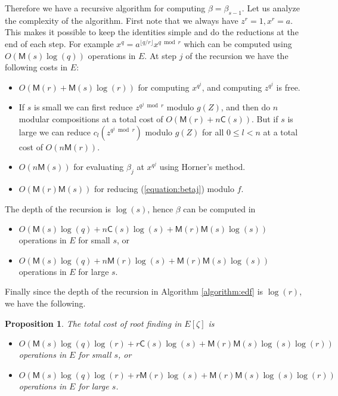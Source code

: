 \documentclass[12pt]{article}
\theoremstyle{plain}
\newtheorem{proposition}[theorem]{Proposition}
\theoremstyle{definition}
\def\MM{\ensuremath{\mathsf{M}}}
\def\CC{\ensuremath{\mathsf{C}}}
\newcounter{algorithm}
\begin{document}
Therefore we have a recursive algorithm for computing $\beta = \beta_{s - 1}$. Let us analyze the 
complexity of the algorithm. First note that we always have $z^r = 1, x^r = a$. This makes it 
possible to keep the identities simple and do the reductions at the end of each step. For example 
$x^q = a^{\lfloor q / r\rfloor}x^{q \bmod r}$ which can be computed using $O(\MM(s)\log(q))$
operations in $E$. At step $j$ of the recursion we have the following costs in $E$:
\begin{itemize}
	\item $O(\MM(r) + \MM(s)\log(r))$ for computing $x^{q^j}$, and computing $z^{q^j}$ is free.
	\item If $s$ is small we can first reduce $z^{q^j \bmod r}$ modulo $g(Z)$, and then do $n$ 
	modular compositions at a total cost
	of $O(\MM(r) + n\CC(s))$. But if $s$ is large we can reduce $c_l(z^{q^j \bmod r})$ modulo 
	$g(Z)$ for all $0 \le l < n$ at a total cost of $O(n\MM(r))$.
	\item $O(n\MM(s))$ for evaluating $\beta_j$ at $x^{q^j}$ using Horner's method.
	\item $O(\MM(r)\MM(s))$ for reducing (\ref{equation:betaj}) modulo $f$.
\end{itemize}
The depth of the recursion is $\log(s)$, hence $\beta$ can be computed in
\begin{itemize}
	\item $O(\MM(s)\log(q) + n\CC(s)\log(s) + \MM(r)\MM(s)\log(s))$ operations in $E$ for small 
	$s$, or
	\item $O(\MM(s)\log(q) + n\MM(r)\log(s) + \MM(r)\MM(s)\log(s))$ operations in $E$ for large 
	$s$.
\end{itemize} 
Finally since the depth of the recursion in Algorithm \ref{algorithm:edf} is $\log(r)$, we have the 
following.
\begin{proposition}
	\label{proposition:root-fpz}
	The total cost of root finding in $E[\zeta]$ is
	\begin{itemize}
		\item $O(\MM(s)\log(q)\log(r) + r\CC(s)\log(s) + \MM(r)\MM(s)\log(s)\log(r))$\\ operations 
		in $E$ for small $s$, or
		\item $O(\MM(s)\log(q)\log(r) + r\MM(r)\log(s) + \MM(r)\MM(s)\log(s)\log(r))$\\ operations 
		in $E$ for large $s$.
	\end{itemize}
\end{proposition}
\end{document}
